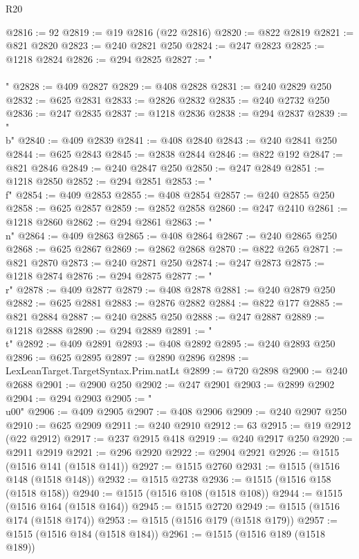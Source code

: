 \begin{lexlean}{R20}
\begin{coremodule}
{@2816 := 92
@2819 := @19 @2816 (@22 @2816)
@2820 := @822 @2819
@2821 := @821 @2820
@2823 := @240 @2821 @250
@2824 := @247 @2823
@2825 := @1218 @2824
@2826 := @294 @2825
@2827 := "\\\\"
@2828 := @409 @2827
@2829 := @408 @2828
@2831 := @240 @2829 @250
@2832 := @625 @2831
@2833 := @2826 @2832
@2835 := @240 @2732 @250
@2836 := @247 @2835
@2837 := @1218 @2836
@2838 := @294 @2837
@2839 := "\\b"
@2840 := @409 @2839
@2841 := @408 @2840
@2843 := @240 @2841 @250
@2844 := @625 @2843
@2845 := @2838 @2844
@2846 := @822 @192
@2847 := @821 @2846
@2849 := @240 @2847 @250
@2850 := @247 @2849
@2851 := @1218 @2850
@2852 := @294 @2851
@2853 := "\\f"
@2854 := @409 @2853
@2855 := @408 @2854
@2857 := @240 @2855 @250
@2858 := @625 @2857
@2859 := @2852 @2858
@2860 := @247 @2410
@2861 := @1218 @2860
@2862 := @294 @2861
@2863 := "\\n"
@2864 := @409 @2863
@2865 := @408 @2864
@2867 := @240 @2865 @250
@2868 := @625 @2867
@2869 := @2862 @2868
@2870 := @822 @265
@2871 := @821 @2870
@2873 := @240 @2871 @250
@2874 := @247 @2873
@2875 := @1218 @2874
@2876 := @294 @2875
@2877 := "\\r"
@2878 := @409 @2877
@2879 := @408 @2878
@2881 := @240 @2879 @250
@2882 := @625 @2881
@2883 := @2876 @2882
@2884 := @822 @177
@2885 := @821 @2884
@2887 := @240 @2885 @250
@2888 := @247 @2887
@2889 := @1218 @2888
@2890 := @294 @2889
@2891 := "\\t"
@2892 := @409 @2891
@2893 := @408 @2892
@2895 := @240 @2893 @250
@2896 := @625 @2895
@2897 := @2890 @2896
@2898 := LexLeanTarget.TargetSyntax.Prim.natLt
@2899 := @720 @2898
@2900 := @240 @2688
@2901 := @2900 @250
@2902 := @247 @2901
@2903 := @2899 @2902
@2904 := @294 @2903
@2905 := "\\u00"
@2906 := @409 @2905
@2907 := @408 @2906
@2909 := @240 @2907 @250
@2910 := @625 @2909
@2911 := @240 @2910
@2912 := 63
@2915 := @19 @2912 (@22 @2912)
@2917 := @237 @2915 @418
@2919 := @240 @2917 @250
@2920 := @2911 @2919
@2921 := @296 @2920
@2922 := @2904 @2921
@2926 := @1515 (@1516 @141 (@1518 @141))
@2927 := @1515 @2760
@2931 := @1515 (@1516 @148 (@1518 @148))
@2932 := @1515 @2738
@2936 := @1515 (@1516 @158 (@1518 @158))
@2940 := @1515 (@1516 @108 (@1518 @108))
@2944 := @1515 (@1516 @164 (@1518 @164))
@2945 := @1515 @2720
@2949 := @1515 (@1516 @174 (@1518 @174))
@2953 := @1515 (@1516 @179 (@1518 @179))
@2957 := @1515 (@1516 @184 (@1518 @184))
@2961 := @1515 (@1516 @189 (@1518 @189))
}
\end{coremodule}
\end{lexlean}
